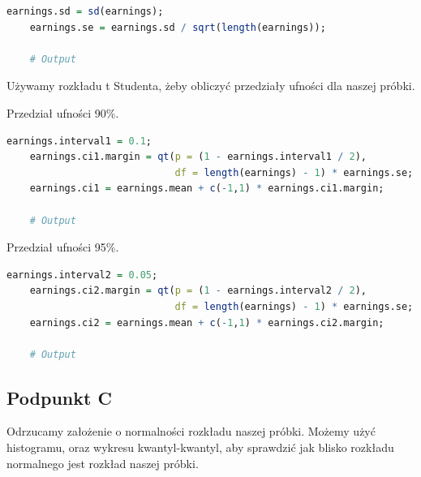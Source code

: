 \documentclass[11pt]{article}
\begin{document}
\begin{lstlisting}[language=R]
    earnings.sd = sd(earnings);
    earnings.se = earnings.sd / sqrt(length(earnings));

    # Output
\end{lstlisting}

Używamy rozkładu t Studenta, żeby obliczyć przedziały ufności dla naszej próbki.

Przedział ufności 90\%.

\begin{lstlisting}[language=R]
    earnings.interval1 = 0.1;
    earnings.ci1.margin = qt(p = (1 - earnings.interval1 / 2),
                             df = length(earnings) - 1) * earnings.se;
    earnings.ci1 = earnings.mean + c(-1,1) * earnings.ci1.margin;

    # Output
\end{lstlisting}

Przedział ufności 95\%.

\begin{lstlisting}[language=R]
    earnings.interval2 = 0.05;
    earnings.ci2.margin = qt(p = (1 - earnings.interval2 / 2),
                             df = length(earnings) - 1) * earnings.se;
    earnings.ci2 = earnings.mean + c(-1,1) * earnings.ci2.margin;

    # Output
\end{lstlisting}

\pagebreak

\subsection{Podpunkt C}
Odrzucamy założenie o normalności rozkładu naszej próbki. Możemy użyć histogramu,
oraz wykresu kwantyl-kwantyl, aby sprawdzić jak blisko rozkładu normalnego jest
rozkład naszej próbki.
\end{document}
